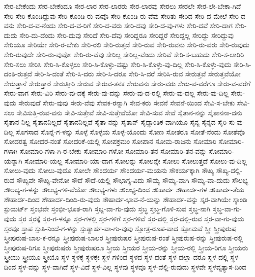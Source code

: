 {ಸೇರ-ಬೇಕೆಂದು
ಸೇರ-ಬೇಕೆಂದೂ
ಸೇರ-ಲಾರ
ಸೇರ-ಲಾರರು
ಸೇರ-ಲಾರವು
ಸೇರಲು
ಸೇರಲೇ
ಸೇರ-ಲೇ-ಬೇಕಾ-ಗಿದೆ
ಸೇರಿ
ಸೇರಿ-ಕೊಂಡಿದ್ದುವು
ಸೇರಿ-ಕೊಂಡಿ-ರು-ವುವೊ
ಸೇರಿ-ಕೊಂಡಿ-ರು-ವೆವು
ಸೇರಿತು
ಸೇರಿದ
ಸೇರಿ-ದ-ಮೇಲೆ
ಸೇರಿ-ದ-ವನು
ಸೇರಿ-ದ-ವ-ನೆಂದು
ಸೇರಿ-ದ-ವ-ರಿಗೆ
ಸೇರಿ-ದ-ವರು
ಸೇರಿ-ದವು
ಸೇರಿ-ದ-ವು-ಗಳು
ಸೇರಿ-ದವೆ
ಸೇರಿ-ದಾಗ
ಸೇರಿ-ದುದು
ಸೇರಿ-ದು-ದೆಂದು
ಸೇರಿ-ದುವು
ಸೇರಿದೆ
ಸೇರಿ-ದೆವು
ಸೇರಿದ್ದರೂ
ಸೇರಿದ್ದರೆ
ಸೇರಿದ್ದಲ್ಲ
ಸೇರಿದ್ದು
ಸೇರಿದ್ದುವು
ಸೇರಿಯೂ
ಸೇರಿಯೇ
ಸೇರಿ-ರ-ಬೇಕು
ಸೇರಿ-ರಲಿ
ಸೇರಿ-ರುತ್ತದೆ
ಸೇರಿ-ರುವ
ಸೇರಿ-ರುವನು
ಸೇರಿ-ರು-ವರು
ಸೇರಿ-ರುವುದು
ಸೇರಿ-ರುವುದೇ
ಸೇರಿ-ರು-ವುವೋ
ಸೇರಿ-ರು-ವೆವು
ಸೇರಿಲ್ಲ
ಸೇರಿಲ್ಲ-ವೆಂದು
ಸೇರಿವೆ
ಸೇರಿ-ಸ-ಬಹುದು
ಸೇರಿ-ಸ-ಲಾರಿರಿ
ಸೇರಿ-ಸಲು
ಸೇರಿಸಿ
ಸೇರಿ-ಸಿ-ಕೊಳ್ಳಲು
ಸೇರಿ-ಸಿ-ಕೊಳ್ಳು-ವಷ್ಟು
ಸೇರಿ-ಸಿ-ಕೊಳ್ಳು-ವು-ದಿಲ್ಲ
ಸೇರಿ-ಸಿ-ಕೊಳ್ಳು-ವುದು
ಸೇರಿ-ಸಿ-ದಂತಿ-ರುತ್ತದೆ
ಸೇರಿ-ಸಿ-ದಂತೆ
ಸೇರಿ-ಸಿ-ದರು
ಸೇರಿ-ಸಿ-ದರೂ
ಸೇರಿ-ಸಿ-ದರೆ
ಸೇರಿಸಿ-ರುವ
ಸೇರುತ್ತವೆ
ಸೇರುತ್ತವೆಯೋ
ಸೇರುತ್ತಾನೆ
ಸೇರುತ್ತಾರೆ
ಸೇರುತ್ತೀರಿ
ಸೇರುವ
ಸೇರುವ-ತನಕ
ಸೇರುವನು
ಸೇರು-ವರು
ಸೇರು-ವ-ವರೆಗೂ
ಸೇರು-ವ-ವರೆಗೆ
ಸೇರು-ವಾಗ
ಸೇರು-ವಿರಿ
ಸೇರು-ವು-ದಕ್ಕೆ
ಸೇರು-ವು-ದನ್ನು
ಸೇರು-ವು-ದ-ರಲ್ಲಿ
ಸೇರು-ವು-ದಲ್ಲ
ಸೇರು-ವು-ದಿಲ್ಲ
ಸೇರು-ವುದು
ಸೇರುವುದೆ
ಸೇರು-ವುವು
ಸೇರು-ವೆವು
ಸೇವಕ-ರನ್ನಾಗಿ
ಸೇವ-ಕರು
ಸೇವನೆ
ಸೇವನೆ-ಯಿಂದ
ಸೇವಿ-ಸ-ಬೇಕು
ಸೇವಿ-ಸಲು
ಸೇವಿಸುತ್ತಿ-ರುವ-ವನು
ಸೇವಿ-ಸುತ್ತೇವೆ
ಸೇವಿ-ಸುತ್ತೇವೆಯೋ
ಸೇವಿ-ಸುವ
ಸೇವೆ
ಸೈತಾನ-ನನ್ನು
ಸೈತಾನನಾ-ದನು
ಸೈತಾನ-ನಿಲ್ಲ
ಸೈತಾನನಿಲ್ಲದೆ
ಸೈತಾನನಿಲ್ಲವೆ
ಸೈತಾ-ನನ್ನು
ಸೈತಾನ್
ಸೈದ್ಧಾಂತಿಕ-ವಾಗಿಯೂ
ಸೈನ್ಯ
ಸೈನ್ಯದ
ಸೈರಿ-ಸು-ವು-ದಿಲ್ಲ
ಸೊಗಸಾದ
ಸೊನ್ನೆ-ಗ-ಳನ್ನು
ಸೊಳ್ಳೆ
ಸೊಳ್ಳೆಯ
ಸೊಳ್ಳೆ-ಯೊಂದು
ಸೋಣ
ಸೋತರೂ
ಸೋತೆ-ನೆಂದು
ಸೋತೆವೊ
ಸೋದರತ್ವ
ಸೋದರ-ನಂತೆ
ಸೋದರಿಕೆ-ಯಲ್ಲಿ
ಸೋಪಕ್ರಮಂ
ಸೋಪಾನ
ಸೋಮ-ರಾಜನು
ಸೋಮಾರಿ
ಸೋಮಾರಿ-ಗಳಾಗಿ
ಸೋಮಾರಿ-ಗಳಾ-ಗಿ-ರ-ಬೇಕು
ಸೋಮಾರಿ-ಗಳೋ
ಸೋಮಾರಿ-ತನ
ಸೋಮಾರಿ-ತನ-ವನ್ನು
ಸೋಮಾರಿ-ಯನ್ನಾಗಿ
ಸೋಮಾರಿ-ಯಲ್ಲ
ಸೋಮಾರಿ-ಯಾ-ದಾಗ
ಸೋಲನ್ನು
ಸೋಲನ್ನೇ
ಸೋಲು
ಸೋಲುತ್ತದೆ
ಸೋಲು-ವು-ದಿಲ್ಲ
ಸೋಲು-ವುದು
ಸೋಲು-ವುದೊ
ಸೋಲೇ
ಸೌಂದರ್ಯ
ಸೌಂದರ್ಯ-ಮಯನು
ಸೌಕರ್ಯಕ್ಕಾಗಿ
ಸೌಖ್ಯ
ಸೌಖ್ಯ-ದಲ್ಲಿ-ರುವ
ಸೌಖ್ಯವೇ
ಸೌಖ್ಯ-ವೇನೋ
ಸೌದೆ
ಸೌದೆ-ಯಲ್ಲಿ
ಸೌಭಾಗ್ಯ-ವಿದು
ಸೌಮ್ಯ
ಸೌಮ್ಯ-ವಾಗಿ
ಸೌಮ್ಯ-ವಾ-ದುದು
ಸೌಲಭ್ಯ
ಸೌಲಭ್ಯ-ಗ-ಳನ್ನು
ಸೌಲಭ್ಯ-ಗಳಿ-ವೆಯೋ
ಸೌಲಭ್ಯ-ಗಳು
ಸೌಲಭ್ಯ-ದಿಂದ
ಸೌಹಾರ್ದ
ಸೌಹಾರ್ದ-ಗಳ
ಸೌಹಾರ್ದ-ತೆಯ
ಸೌಹಾರ್ದ-ದಿಂದ
ಸೌಹಾರ್ದ-ದಿಂದಿ-ರು-ವುದು
ಸೌಹಾರ್ದ-ಭಾವ-ನೆ-ಯನ್ನು
ಸೌಹಾರ್ದ-ವನ್ನು
ಸ್ಕರ-ವಾಗಿಯೇ
ಸ್ಕಾಂಡಿ
ಸ್ಟುಯರ್ಟ್
ಸ್ತಂಭವೇ
ಸ್ತಂಭೀ-ಭೂತ-ರಾಗಿ
ಸ್ತಬ್ದ-ವಾ-ಗು-ವುದು
ಸ್ತಬ್ಧ
ಸ್ತಬ್ಧ-ಗೊಳಿ-ಸುವ
ಸ್ತಬ್ಧ-ನಾಗಿ
ಸ್ತಬ್ಧ-ವಾ-ಗು-ವುದು
ಸ್ತರ
ಸ್ತರಕ್ಕೆ
ಸ್ತರ-ಗ-ಳನ್ನೂ
ಸ್ತರ-ಗಳಲ್ಲಿ
ಸ್ತರ-ಗಳಿಗೆ
ಸ್ತರ-ಗಳಿವೆ
ಸ್ತರ-ದಲ್ಲಿ
ಸ್ತರ-ದಲ್ಲಿ-ರುವ
ಸ್ತರ-ವಾ-ಗು-ವುದು
ಸ್ತರವೂ
ಸ್ತಾಪ
ಸ್ತುತಿ-ನಿಂದೆ-ಗ-ಳನ್ನು
ಸ್ತುತ್ಯಾರ್ಹ-ವಾ-ಗು-ವುವು
ಸ್ತೋತ್ರ-ರೂಪ-ವಾದ
ಸ್ತೋಮವೆ
ಸ್ತ್ರೀ
ಸ್ತ್ರೀಪುರುಷ
ಸ್ತ್ರೀಪುರುಷ-ಬಾಲ-ಕ-ರನ್ನೂ
ಸ್ತ್ರೀಪುರುಷ-ಬಾಲರ
ಸ್ತ್ರೀಪುರುಷರ
ಸ್ತ್ರೀಪುರುಷ-ರಂತೆ
ಸ್ತ್ರೀಪುರುಷ-ರನ್ನು
ಸ್ತ್ರೀಪುರುಷ-ರಲ್ಲಿ
ಸ್ತ್ರೀಪುರುಷ-ರಿಗೂ
ಸ್ತ್ರೀಪುರುಷರು
ಸ್ತ್ರೀಪುರುಷರೂ
ಸ್ತ್ರೀಯ
ಸ್ತ್ರೀಯರ
ಸ್ತ್ರೀಯ-ರನ್ನು
ಸ್ತ್ರೀಯ-ರಲ್ಲಿ
ಸ್ತ್ರೀಯ-ರಿಗೂ
ಸ್ತ್ರೀಯರು
ಸ್ತ್ರೀಯು
ಸ್ತ್ರೀಯೂ
ಸ್ತ್ರೀಯೊ
ಸ್ಥಳ
ಸ್ಥಳಕ್ಕೆ
ಸ್ಥಳಕ್ಕೇ
ಸ್ಥಳ-ಗಳಿಂದ
ಸ್ಥಳದ
ಸ್ಥಳ-ದಂತೆ
ಸ್ಥಳ-ದಲ್ಲಾ-ದರೂ
ಸ್ಥಳ-ದಲ್ಲಿ
ಸ್ಥಳ-ದಿಂದ
ಸ್ಥಳ-ವನ್ನು
ಸ್ಥಳ-ವಾಗಿದೆ
ಸ್ಥಳ-ವಿದೆ
ಸ್ಥಳ-ವಿಲ್ಲ
ಸ್ಥಳವು
ಸ್ಥಳವೂ
ಸ್ಥಳ-ವೆಲ್ಲಿ-ರುವುದು
ಸ್ಥಳವೇ
ಸ್ಥಳವ್ಯತ್ಯಾಸ-ದಿಂದ
}
